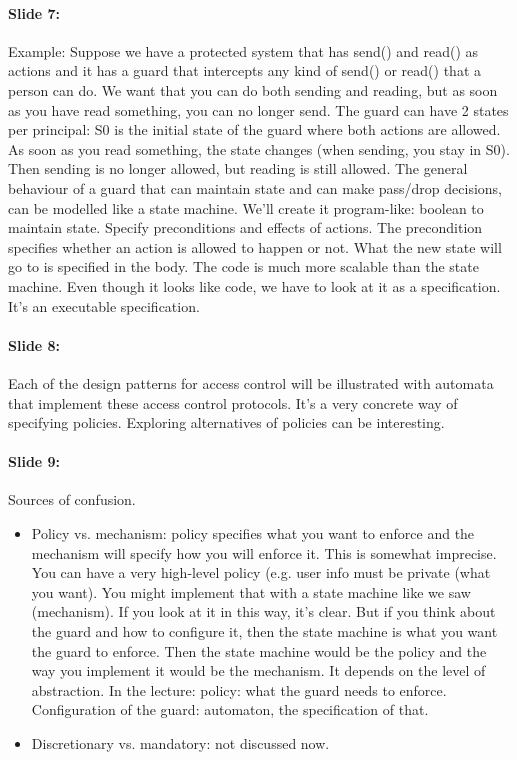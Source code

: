 \documentclass[10pt,a4paper]{report}
\begin{document}
\paragraph{Slide 7:} Example: Suppose we have a protected system that has send() and read() as actions and it has a guard that intercepts any kind of send() or read() that a person can do. We want that you can do both sending and reading, but as soon as you have read something, you can no longer send. The guard can have 2 states per principal: S0 is the initial state of the guard where both actions are allowed. As soon as you read something, the state changes (when sending, you stay in S0). Then sending is no longer allowed, but reading is still allowed. The general behaviour of a guard that can maintain state and can make pass/drop decisions, can be modelled like a state machine. We'll create it program-like: boolean to maintain state. Specify preconditions and effects of actions. The precondition specifies whether an action is allowed to happen or not. What the new state will go to is specified in the body. The code is much more scalable than the state machine. Even though it looks like code, we have to look at it as a specification. It's an executable specification. 

\paragraph{Slide 8:} Each of the design patterns for access control will be illustrated with automata that implement these access control protocols. It's a very concrete way of specifying policies. Exploring alternatives of policies can be interesting. 

\paragraph{Slide 9:} Sources of confusion.
\begin{itemize}
\item Policy vs. mechanism: policy specifies what you want to enforce and the mechanism will specify how you will enforce it. This is somewhat imprecise. You can have a very high-level policy (e.g. user info must be private (what you want). You might implement that with a state machine like we saw (mechanism). If you look at it in this way, it's clear. But if you think about the guard and how to configure it, then the state machine is what you want the guard to enforce. Then the state machine would be the policy and the way you implement it would be the mechanism. It depends on the level of abstraction. In the lecture: policy: what the guard needs to enforce. Configuration of the guard: automaton, the specification of that.
\item Discretionary vs. mandatory: not discussed now.
\end{itemize}
\end{document}

